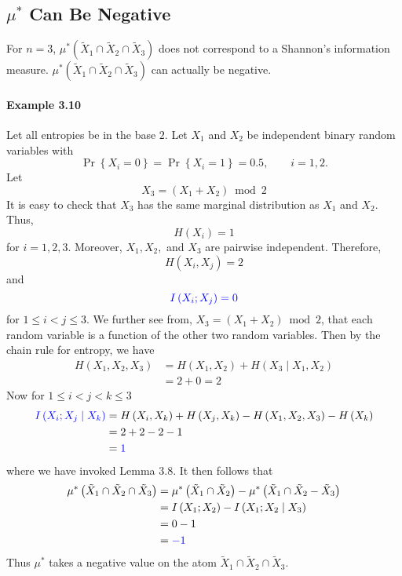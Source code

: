\documentclass[8pt]{article}
\begin{document}
\subsection{$\mu^{*}$ Can Be Negative}
For $n = 3$, $\mu^{*}\left(\tilde{X}_{1} \cap \tilde{X}_{2} \cap \tilde{X}_{3}\right)$ does not correspond to a Shannon's information measure. $\mu^{*}\left(\tilde{X}_{1} \cap \tilde{X}_{2} \cap \tilde{X}_{3}\right)$ can actually be negative.

\paragraph{Example 3.10} Let all entropies be in the base $2 .$ Let $X_{1}$ and $X_{2}$ be independent binary random variables with
$$
\operatorname{Pr}\left\{X_{i}=0\right\}=\operatorname{Pr}\left\{X_{i}=1\right\}=0.5, \qquad i=1,2.
$$
Let
$$
X_{3}=\left(X_{1}+X_{2}\right) \bmod 2
$$
It is easy to check that $X_{3}$ has the same marginal distribution as $X_{1}$ and $X_{2}$. Thus,
$$
H\left(X_{i}\right)=1
$$
for $i=1,2,3 .$ Moreover, $X_{1}, X_{2},$ and $X_{3}$ are pairwise independent. Therefore,
$$
H\left(X_{i}, X_{j}\right)=2
$$
and
$$
\color{blue} I\left(X_{i} ; X_{j}\right)=0
$$
for $1 \leq i<j \leq 3 .$ We further see from, $X_{3}=\left(X_{1}+X_{2}\right) \bmod 2$, that each random variable is a function of the other two random variables. Then by the chain rule for entropy, we have
$$
\begin{aligned}
H\left(X_{1}, X_{2}, X_{3}\right) &=H\left(X_{1}, X_{2}\right)+H\left(X_{3} \mid X_{1}, X_{2}\right) \\
&=2+0 =2
\end{aligned}
$$
Now for $1 \leq i<j<k \leq 3$
$$
\begin{aligned}
\color{blue} I\left(X_{i} ; X_{j} \mid X_{k}\right) &=H\left(X_{i}, X_{k}\right)+H\left(X_{j}, X_{k}\right)-H\left(X_{1}, X_{2}, X_{3}\right)-H\left(X_{k}\right) \\
&=2+2-2-1 \\
&= \color{blue} 1
\end{aligned}
$$
where we have invoked Lemma $3.8.$ It then follows that
$$
\begin{aligned}
\mu^{*}\left(\tilde{X}_{1} \cap \tilde{X}_{2} \cap \tilde{X}_{3}\right) &=\mu^{*}\left(\tilde{X}_{1} \cap \tilde{X}_{2}\right)-\mu^{*}\left(\tilde{X}_{1} \cap \tilde{X}_{2}-\tilde{X}_{3}\right) \\
&=I\left(X_{1} ; X_{2}\right)-I\left(X_{1} ; X_{2} \mid X_{3}\right) \\
&=0-1 \\
&= \color{blue} -1
\end{aligned}
$$
Thus $\mu^{*}$ takes a negative value on the atom $\tilde{X}_{1} \cap \tilde{X}_{2} \cap \tilde{X}_{3}$.
\end{document}
